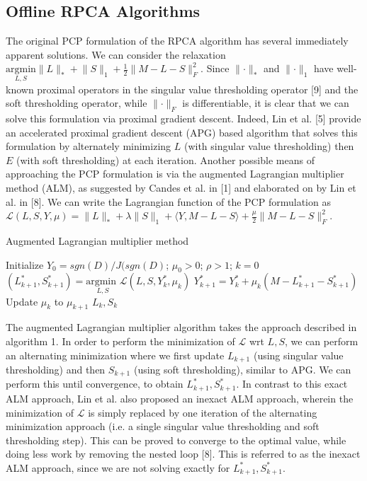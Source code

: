 \documentclass[oneside]{article}
\begin{document}
\subsection{Offline RPCA Algorithms}
The original PCP formulation of the RPCA algorithm  has several immediately apparent solutions. We can consider the relaxation $\underset{L,S}{\text{argmin}} \lVert L\rVert_{*} + \lVert S\rVert_{1} + \frac{1}{2}\lVert M-L-S\rVert^{2}_{F}$. Since $\lVert\cdot\rVert_{*}$ and $\lVert\cdot\rVert_{1}$ have well-known proximal operators in the singular value thresholding operator [9] and the soft thresholding operator, while $\lVert\cdot\rVert_{F}$ is differentiable, it is clear that we can solve this formulation via proximal gradient descent. Indeed, Lin et al. [5] provide an accelerated proximal gradient descent (APG) based algorithm that solves this formulation by alternately minimizing $L$ (with singular value thresholding) then $E$ (with soft thresholding) at each iteration.\newline\newline
Another possible means of approaching the PCP formulation is via the augmented Lagrangian multiplier method (ALM), as suggested by Candes et al. in [1] and elaborated on by Lin et al. in [8]. We can write the Lagrangian function of the PCP formulation as $\mathcal{L}(L,S, Y, \mu) = \lVert L\rVert_{*} + \lambda\lVert S\rVert_{1} + \langle Y, M-L-S\rangle +\frac{\mu}{2}\lVert M-L-S\rVert_{F}^{2}$.
\begin{algorithm}
 \caption{Augmented Lagrangian multiplier method}
 \begin{algorithmic}  
 \STATE Initialize $Y_{0} = sgn(D)/J(sgn(D)$; $\mu_{0} >0$; $\rho > 1$; $k = 0$
\STATE $(L_{k+1}^{*}, S_{k+1}^{*}) = \underset{L,S}{\text{argmin   }}\mathcal{L}(L,S,Y_{k}^{*},\mu_{k})$
\STATE $Y_{k+1}^{*} = Y_{k}^{*} + \mu_{k}(M-L_{k+1}^{*}-S_{k+1}^{*})$
\STATE Update $\mu_{k}$ to $\mu_{k+1}$
\ENDWHILE
\RETURN $L_{k}, S_{k}$
 \end{algorithmic}
 \end{algorithm}\newline
The augmented Lagrangian multiplier algorithm takes the approach described in algorithm 1. In order to perform the minimization of $\mathcal{L}$ wrt $L, S$, we can perform an alternating minimization where we first update $L_{k+1}$ (using singular value thresholding) and then $S_{k+1}$ (using soft thresholding), similar to APG. We can perform this until convergence, to obtain $L_{k+1}^{*}, S_{k+1}^{*}$. In contrast to this exact ALM approach, Lin et al. also proposed an inexact ALM approach, wherein the minimization of $\mathcal{L}$ is simply replaced by one iteration of the alternating minimization approach (i.e. a single singular value thresholding and soft thresholding step). This can be proved to converge to the optimal value, while doing less work by removing the nested loop [8]. This is referred to as the inexact ALM approach, since we are not solving exactly for $L_{k+1}^{*}, S_{k+1}^{*}$.\newline\newline
\end{document}
